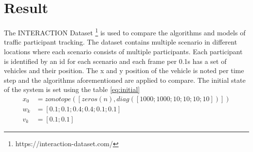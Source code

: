 \chapter{Result} \label{ch:result}
The INTERACTION Dataset \footnote{https://interaction-dataset.com/} is used to compare the algorithms and models of traffic participant tracking. The dataset contains multiple scenario in different locations where each scenario consists of multiple participants. Each participant is identified by an id for each scenario and each frame per 0.1s has a set of vehicles and their position. The x and y position of the vehicle is noted per time step and the algorithms aforementioned are applied to compare. The initial state of the system is set using the table \ref{eq:initial}
\begin{equation*}
\label{eq:initial}
\begin{split}
x_0 &= zonotope([zeros(n), diag([1000;1000;10;10;10;10])])\\
w_k &= [0.1;0.1;0.4;0.4;0.1;0.1]\\
v_k &= [0.1;0.1]
\end{split}
\end{equation*}

